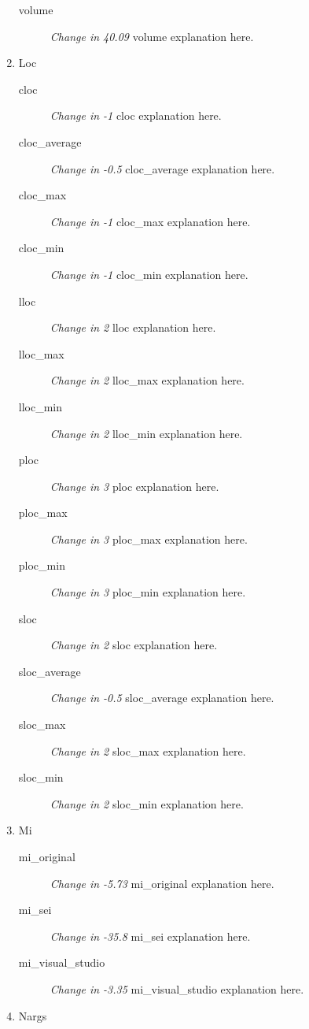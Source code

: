 \begin{enumerate}
\begin{description}
          \item [volume] \textit{Change in 40.09} volume explanation here.
        \end{description}
  \item Loc
        \begin{description}
          \item [cloc] \textit{Change in -1} cloc explanation here.
          \item [cloc\_average] \textit{Change in -0.5} cloc\_average explanation here.
          \item [cloc\_max] \textit{Change in -1} cloc\_max explanation here.
          \item [cloc\_min] \textit{Change in -1} cloc\_min explanation here.
          \item [lloc] \textit{Change in 2} lloc explanation here.
          \item [lloc\_max] \textit{Change in 2} lloc\_max explanation here.
          \item [lloc\_min] \textit{Change in 2} lloc\_min explanation here.
          \item [ploc] \textit{Change in 3} ploc explanation here.
          \item [ploc\_max] \textit{Change in 3} ploc\_max explanation here.
          \item [ploc\_min] \textit{Change in 3} ploc\_min explanation here.
          \item [sloc] \textit{Change in 2} sloc explanation here.
          \item [sloc\_average] \textit{Change in -0.5} sloc\_average explanation here.
          \item [sloc\_max] \textit{Change in 2} sloc\_max explanation here.
          \item [sloc\_min] \textit{Change in 2} sloc\_min explanation here.
        \end{description}
  \item Mi
        \begin{description}
          \item [mi\_original] \textit{Change in -5.73} mi\_original explanation here.
          \item [mi\_sei] \textit{Change in -35.8} mi\_sei explanation here.
          \item [mi\_visual\_studio] \textit{Change in -3.35} mi\_visual\_studio explanation here.
        \end{description}
  \item Nargs

\end{enumerate}
